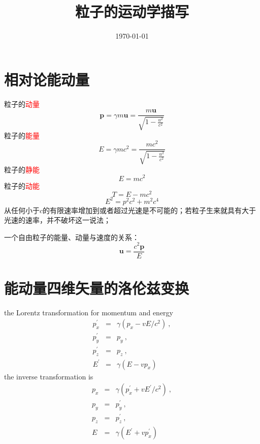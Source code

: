 \documentclass[11pt,a4paper]{article}
\title{粒子的运动学描写}
\author{}
\date{\today}
\renewcommand{\vec}[1]{\boldsymbol{#1}}
\begin{document}
\maketitle

\section{相对论能动量}
粒子的\textcolor{red}{动量}
\begin{equation}
\vec{p} = \gamma m \vec{u} = \frac{m\vec{u}}{\sqrt{1-\frac{u^2}{c^2}}}
\end{equation}
粒子的\textcolor{red}{能量}
\begin{equation}
E = \gamma m c^2 = \frac{m c^2}{\sqrt{1-\frac{u^2}{c^2}}}
\end{equation}
粒子的\textcolor{red}{静能}
\begin{equation}
E = m c^2
\end{equation}
粒子的\textcolor{red}{动能}
\begin{equation}
T = E - mc^2
\end{equation}
\begin{equation}
E^2 = p^2 c^2 +m^2 c^4
\end{equation}
从任何小于$c$的有限速率增加到或者超过光速是不可能的；若粒子生来就具有大于光速的速率，并不破坏这一说法；

一个自由粒子的能量、动量与速度的关系：
\begin{equation}
\vec{u} = \frac{c^2 \vec{p}}{E}
\end{equation}

\section{能动量四维矢量的洛伦兹变换}
the Lorentz transformation for momentum and energy
\begin{eqnarray}
\nonumber p^{\prime}_x &=& \gamma(p_x -vE/c^2) ~, \\
\nonumber p^{\prime}_y &=& p_y ~, \\
\nonumber p^{\prime}_z &=& p_z ~, \\
E^{\prime} &=& \gamma(E -vp_x)
\end{eqnarray}
the inverse transformation is
\begin{eqnarray}
\nonumber p_x &=& \gamma(p^{\prime}_x +vE^{\prime}/c^2) ~, \\
\nonumber p_y &=& p^{\prime}_y ~, \\
\nonumber p_z &=& p^{\prime}_z ~, \\
E &=& \gamma(E^{\prime} +vp^{\prime}_x)
\end{eqnarray}
\end{document}
